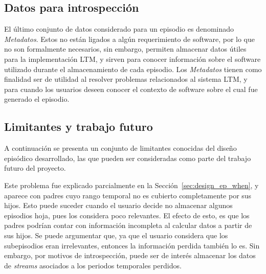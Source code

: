 \subsection{Datos para introspección}

El último conjunto de datos considerado para un episodio es denominado \textit{Metadatos}. Estos no están ligados a algún requerimiento de software, por lo que no son formalmente necesarios, sin embargo, permiten almacenar datos útiles para la implementación LTM, y sirven para conocer información sobre el software utilizado durante el almacenamiento de cada episodio. Los \textit{Metadatos} tienen como finalidad ser de utilidad al resolver problemas relacionados al sistema LTM, y para cuando los usuarios deseen conocer el contexto de software sobre el cual fue generado el episodio.


\subsection{Limitantes y trabajo futuro}

A continuación se presenta un conjunto de limitantes conocidas del diseño episódico desarrollado, las que pueden ser consideradas como parte del trabajo futuro del proyecto.

Este problema fue explicado parcialmente en la Sección~\ref{sec:design_ep_when}, y aparece con padres cuyo rango temporal no es cubierto completamente por sus hijos. Esto puede suceder cuando el usuario decide no almacenar algunos episodios hoja, pues los considera poco relevantes. El efecto de esto, es que los padres podrían contar con información incompleta al calcular datos a partir de sus hijos. Se puede argumentar que, ya que el usuario considera que los subepisodios eran irrelevantes, entonces la información perdida también lo es. Sin embargo, por motivos de introspección, puede ser de interés almacenar los datos de \textit{streams} asociados a los periodos temporales perdidos.

